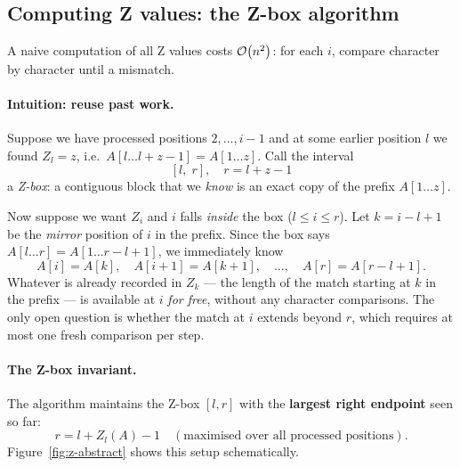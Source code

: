 \subsection{Computing Z values: the Z-box algorithm}

A naive computation of all Z values costs $\mathcal{O}\!\left(n^2\right)$: for each $i$, compare
character by character until a mismatch.

\paragraph{Intuition: reuse past work.}
Suppose we have processed positions $2, \ldots, i{-}1$ and at some earlier
position $l$ we found $Z_l = z$, i.e.\ $A[l\ldots l{+}z{-}1] = A[1\ldots z]$.
Call the interval
\[
  [l,\; r], \quad r = l + z - 1
\]
a \emph{Z-box}: a contiguous block that we \emph{know} is an exact copy of the
prefix $A[1\ldots z]$.

Now suppose we want $Z_i$ and $i$ falls \emph{inside} the box ($l \le i \le r$).
Let $k = i{-}l{+}1$ be the \emph{mirror} position of $i$ in the prefix.  Since
the box says $A[l\ldots r] = A[1\ldots r{-}l{+}1]$, we immediately know
\[
  A[i] = A[k],\quad A[i{+}1] = A[k{+}1],\quad \ldots,\quad A[r] = A[r{-}l{+}1].
\]
Whatever is already recorded in $Z_k$ — the length of the match starting at
$k$ in the prefix — is available at $i$ \emph{for free}, without any character
comparisons.  The only open question is whether the match at $i$ extends beyond
$r$, which requires at most one fresh comparison per step.

\paragraph{The Z-box invariant.}
The algorithm maintains the Z-box $[l, r]$ with the \textbf{largest right endpoint}
seen so far:
\[
  r = l + Z_l(A) - 1 \quad (\text{maximised over all processed positions}).
\]
Figure~\ref{fig:z-abstract} shows this setup schematically.

